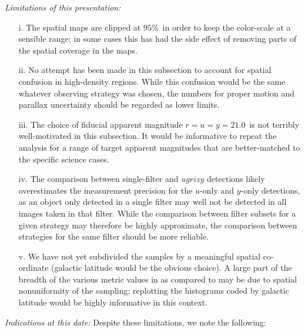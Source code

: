 {\it Limitations of this presentation:} 
\begin{itemize}
  \item[i.] The spatial maps are clipped at $95\%$~in order to keep
    the color-scale at a sensible range; in some cases this has had
    the side effect of removing parts of the spatial coverage in the
     maps. 

  \item[ii.] No attempt has been made in this subsection to account
    for spatial confusion in high-density regions. While this
    confusion would be the same whatever observing strategy was
    chosen, the numbers for proper motion and parallax uncertainty
    should be regarded as lower limits.

    \item[iii.] The choice of fiducial apparent magnitude $r = u = y =
      21.0$~is not terribly well-motivated in this subsection. It
      would be informative to repeat the analysis for a range of
      target apparent magnitudes that are better-matched to the
      specific science cases.

      \item[iv.] The comparison between single-filter and $ugrizy$
        detections likely overestimates the measurement precision for
        the $u$-only and $y$-only detections, as an object only
        detected in a single filter may well not be detected in all
        images taken in that filter. While the comparison between
        filter subsets for a given strategy may therefore be highly
        approximate, the comparison between strategies for the same
        filter should be more reliable.

  \item[v.] We have not yet subdivided the samples by a meaningful
    spatial co-ordinate (galactic latitude would be the obvious
    choice). A large part of the breadth of the various metric values in
     as compared to  may be
      due to spatial nonuniformity of the sampling; replotting the
      histograms coded by galactic latitude would be highly informative in this context.

\end{itemize}

{\it Indications at this date:} Despite these limitations, we note the following: 

